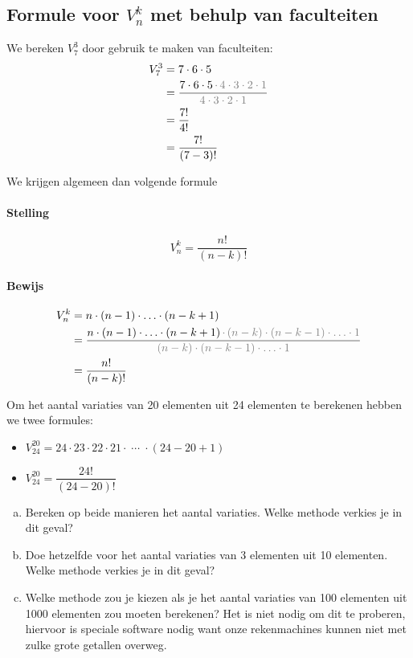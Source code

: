 \documentclass[12pt,a4paper,twoside]{article}
\begin{document}
\subsection{Formule voor $V^k_n$ met behulp van faculteiten}

We bereken $V^3_7$ door gebruik te maken van faculteiten:
\begin{align*}
  V^3_7 &= 7 \cdot 6 \cdot 5\\
        &= \dfrac{7 \cdot 6 \cdot 5 \, \color{gray}{ \cdot \, 4 \cdot 3 \cdot 2 \cdot 1}}{\color{gray}{4 \cdot 3 \cdot 2 \cdot 1}}\\
        &= \dfrac{7!}{4!}\\
        &= \dfrac{7!}{(7-3)!}\\
\end{align*}

We krijgen algemeen dan volgende formule

\paragraph*{Stelling}
\begin{mdframed}
$$V^k_n=\dfrac{n!}{(n-k)!}$$
\end{mdframed}

\paragraph*{Bewijs}
\begin{align*}
  V^k_n &= n \cdot (n-1) \cdot \ldots \cdot (n-k+1)\\
        &= \dfrac{n \cdot (n-1) \cdot \ldots \cdot (n-k+1) \, \color{gray}{ \cdot \, (n-k) \cdot (n-k-1) \cdot \ldots \cdot 1}}{\color{gray}{(n-k) \cdot (n-k-1) \cdot \ldots \cdot 1}}\\
        &= \dfrac{n!}{(n-k)!}\\
\end{align*}


\begin{oefening}
Om het aantal variaties van 20 elementen uit 24 elementen te berekenen hebben we twee formules:\\
\begin{itemize}
  \itemsep1em
  \item $\displaystyle V^{20}_{24}=24\cdot23\cdot22\cdot21\cdot\;\cdots\;\cdot(24-20+1)$
  \item $\displaystyle V^{20}_{24}=\dfrac{24!}{(24-20)!}$
\end{itemize}
\begin{enumerate}[(a)]
  \item Bereken op beide manieren het aantal variaties. Welke methode verkies je in dit geval?
  \item Doe hetzelfde voor het aantal variaties van 3 elementen uit 10 elementen. Welke methode verkies je in dit geval?
  \item Welke methode zou je kiezen als je het aantal variaties van 100 elementen uit 1000 elementen zou moeten berekenen? Het is niet nodig om dit te proberen, hiervoor is speciale software nodig want onze rekenmachines kunnen niet met zulke grote getallen overweg.
\end{enumerate}
\end{oefening}
\end{document}
